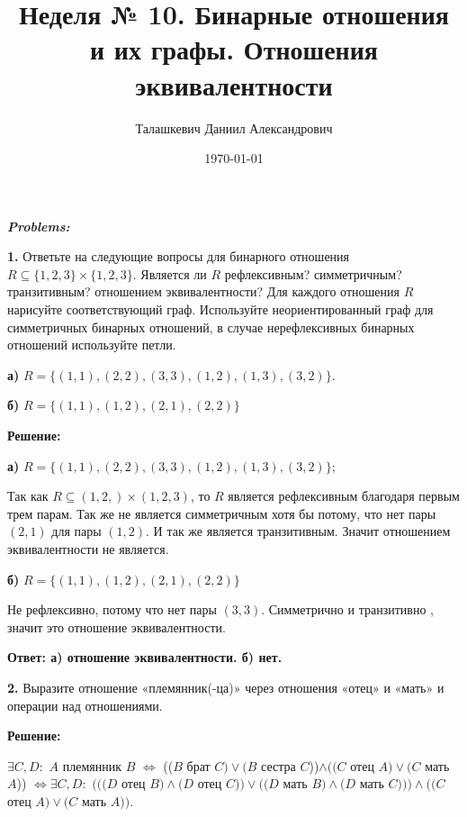 \documentclass[a4paper,12pt]{article} %
\author{Талашкевич Даниил Александрович}
\title{Неделя № 10. Бинарные отношения и их графы.
Отношения эквивалентности}
\date{\today}
\begin{document}
\maketitle
\thispagestyle{empty}

\newpage
\setcounter{page}{1}
\begin{center}
\itshape
\bfseries
{ \Large Problems:}
\end{center}

{\bf 1.} Ответьте на следующие вопросы для бинарного отношения $R \subseteq \{1, 2, 3\}\times\{1, 2, 3\}$. Является ли $R$ рефлексивным? симметричным? транзитивным? отношением эквивалентности? Для каждого отношения $R$ нарисуйте соответствующий граф. Используйте неориентированный граф для симметричных бинарных отношений, в случае нерефлексивных бинарных отношений используйте петли.

{\bf а)} $R = \{ (1,1), (2,2), (3,3), (1,2), (1,3), (3,2)\}$.

{\bf б)} $R = \{ (1,1), (1,2), (2,1), (2,2)\}$
\begin{center}
\bfseries
{\Large Решение: }
\end{center}

{\bf а)} $R = \{ (1,1),(2,2),(3,3),(1,2),(1,3),(3,2)\};$

Так как $R \subseteq (1,2,) \times (1,2,3)$, то $R$ является рефлексивным благодаря первым трем парам. Так же не является симметричным хотя бы потому, что нет пары $(2,1)$ для пары $(1,2)$. И так же является транзитивным. Значит отношением эквивалентности не является.

{\bf б)} $R = \{(1,1), (1,2), (2,1), (2,2) \}$

Не рефлексивно, потому что нет пары $(3,3)$. Симметрично и транзитивно , значит это отношение эквивалентности.

\begin{flushright}
\begin{large}
\textbf {Ответ: а) отношение эквивалентности. б) нет.}
\end{large}
\end{flushright}

{\bf 2.} Выразите отношение «племянник(-ца)» через отношения «отец» и
«мать» и операции над отношениями. 
\begin{center}
\bfseries
{\Large Решение: }
\end{center}

$\exists C,D:$ $A$ племянник $B$ $\Leftrightarrow$ (($B$ брат $C) \vee (B$ сестра $C$))$\wedge ((C$ отец $A) \vee (C$ мать $A$)) $\Leftrightarrow  \exists C,D:$ $(((D$ отец $B) \wedge (D$ отец $C)) \vee ((D$ мать $B) \wedge (D$ мать $C))) \wedge ((C$ отец $A) \vee (C$ мать $A))$. 
\end{document}
